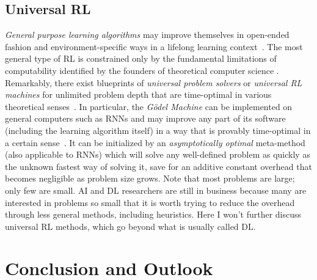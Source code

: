 \documentclass[letterpaper]{article}
\begin{document}
\begin{CJK*}{UTF8}{gbsn}
\begin{sloppypar}
\subsection{Universal RL}
\label{unirl}


{\em General purpose learning algorithms}
may improve themselves in open-ended fashion
and environment-specific 
ways in a lifelong learning 
context~\citep{schmidhuber87,Schmidhuber:97bias,Schmidhuber:97ssa,scholarpedia2010}. 
The most general type of RL is constrained only by the
fundamental limitations of computability identified by 
the founders of theoretical computer science 
\citep{Goedel:31,Church:36,Turing:36,Post:36}.
Remarkably, there exist blueprints of
 {\em universal problem solvers} or {\em universal RL machines}
for unlimited problem depth 
that are  
time-optimal in various theoretical senses~\citep{Hutter:05book+,Hutter:01fast+,Schmidhuber:02colt,Schmidhuber:05gmai}. 
In particular, the {\em G\"{o}del Machine} can be implemented 
on general computers such as RNNs and may improve 
any part of its software (including the learning algorithm itself)  
in a way that is provably time-optimal in a certain sense~\citep{Schmidhuber:05gmai}. It can be initialized by an 
{\em asymptotically optimal}
meta-method~\citep{Hutter:01fast+} (also applicable to RNNs)
which will solve any well-defined problem as quickly as the unknown fastest way of solving it, save for an additive constant overhead that becomes negligible as problem size grows. Note that most problems are large; only few are small. AI and DL researchers are still in business because many are interested in problems so small that it is worth trying to reduce the overhead through less general methods, including heuristics. Here I won't further discuss universal RL methods, which go beyond what is usually called DL. 

\section{Conclusion and Outlook}
\label{outlook}


\end{sloppypar}
\end{CJK*}
\end{document}
